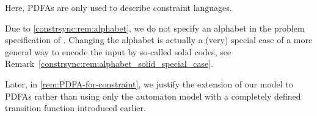 Here, PDFAs are only used to describe constraint languages. 

Due to \cref{constrsync:rem:alphabet}, we do not specify an alphabet in the problem
specification of .
Changing the alphabet is actually a (very) special case
of a more general way to encode
the input by so-called solid codes, see Remark~\ref{constrsync:rem:alphabet_solid_special_case}.	


Later, in \cref{rem:PDFA-for-constraint}, we justify the extension of our model to 
PDFAs rather than using only the automaton model with a completely defined transition function introduced earlier.